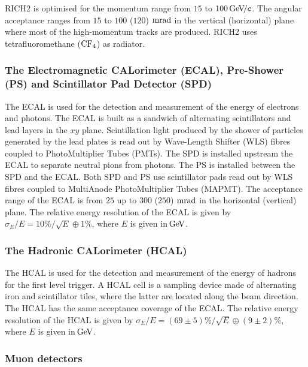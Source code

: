 RICH2 is optimised for the momentum range from $15$ to $100{\mathrm{\,Ge\kern -0.1em V\!/}c}$. The angular acceptance ranges from $15$ to $100$ ($120$) $\rm mrad$ in the vertical (horizontal) plane where most of the high-momentum tracks are produced. RICH2 uses tetrafluoromethane ($\rm CF_4$) as radiator.

\subsubsection*{The Electromagnetic CALorimeter (ECAL), Pre-Shower (PS) and Scintillator Pad Detector (SPD)}

The ECAL \cite{CAL} is used for the detection and measurement of the energy of electrons and
photons. The ECAL is built as a sandwich of alternating scintillators and
lead layers in the $xy$ plane. Scintillation light produced by the shower of
particles generated by the lead plates is read out by Wave-Length Shifter (WLS) fibres coupled
to PhotoMultiplier Tubes (PMTs). The SPD is installed upstream the ECAL to separate neutral pions
from photons. The PS is installed between the SPD and
the ECAL. Both SPD and PS use scintillator
pads read out by WLS fibres coupled to MultiAnode PhotoMultiplier Tubes (MAPMT). The
acceptance range of the ECAL is from $25$ up to $300$ ($250$) $\rm mrad$ in the horizontal (vertical) 
plane. The relative energy resolution of the ECAL is given by $\sigma_E / E = 10\%/\sqrt{E}\oplus 1\%$, where $E$ is given
in$\mathrm{\,Ge\kern -0.1em V}$.

\subsubsection*{The Hadronic CALorimeter (HCAL)}

The HCAL \cite{CAL} is used for the detection and measurement of the energy of hadrons 
for the first level trigger. A HCAL cell is a sampling device made of
alternating iron and scintillator tiles, where the latter are located along the beam direction. The HCAL
has the same acceptance coverage of the ECAL. The relative energy resolution of the HCAL
is given by $\sigma_E / E = (69\pm 5)\%/\sqrt{E}\oplus (9\pm 2)\%$, where $E$ is given in$\mathrm{\,Ge\kern -0.1em V}$. 

\subsubsection*{Muon detectors}

